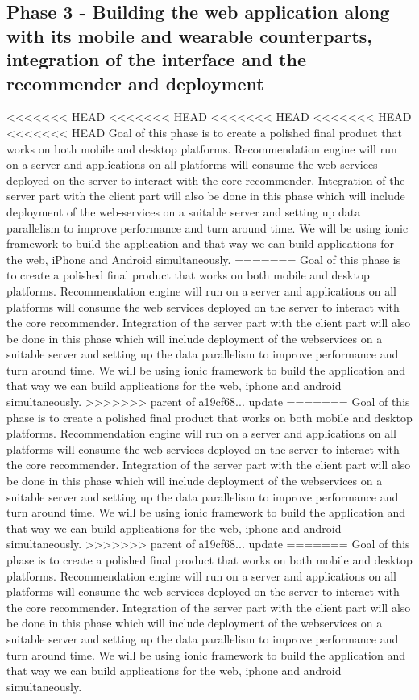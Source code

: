 \documentclass{article}
\begin{document}
\subsection{Phase 3 - Building the web application along with its mobile and wearable counterparts, integration of the interface and the recommender and deployment}
<<<<<<< HEAD
<<<<<<< HEAD
<<<<<<< HEAD
<<<<<<< HEAD
<<<<<<< HEAD
Goal of this phase is to create a polished final product that works on both mobile and desktop platforms. Recommendation engine will run on a server and applications on all platforms will consume the web services deployed on the server to interact with the core recommender. Integration of the server part with the client part will also be done in this phase which will include deployment of the web-services on a suitable server and setting up  data parallelism to improve performance and turn around time. We will be using ionic framework to build the application and that way we can build applications for the web, iPhone and Android simultaneously. 
=======
Goal of this phase is to create a polished final product that works on both mobile and desktop platforms. Recommendation engine will run on a server and applications on all platforms will consume the web services deployed on the server to interact with the core recommender. Integration of the server part with the client part will also be done in this phase which will include deployment of the webservices on a suitable server and setting up the data parallelism to improve performance and turn around time. We will be using ionic framework to build the application and that way we can build applications for the web, iphone and android simultaneously. 
>>>>>>> parent of a19cf68... update
=======
Goal of this phase is to create a polished final product that works on both mobile and desktop platforms. Recommendation engine will run on a server and applications on all platforms will consume the web services deployed on the server to interact with the core recommender. Integration of the server part with the client part will also be done in this phase which will include deployment of the webservices on a suitable server and setting up the data parallelism to improve performance and turn around time. We will be using ionic framework to build the application and that way we can build applications for the web, iphone and android simultaneously. 
>>>>>>> parent of a19cf68... update
=======
Goal of this phase is to create a polished final product that works on both mobile and desktop platforms. Recommendation engine will run on a server and applications on all platforms will consume the web services deployed on the server to interact with the core recommender. Integration of the server part with the client part will also be done in this phase which will include deployment of the webservices on a suitable server and setting up the data parallelism to improve performance and turn around time. We will be using ionic framework to build the application and that way we can build applications for the web, iphone and android simultaneously. 
\end{document}
